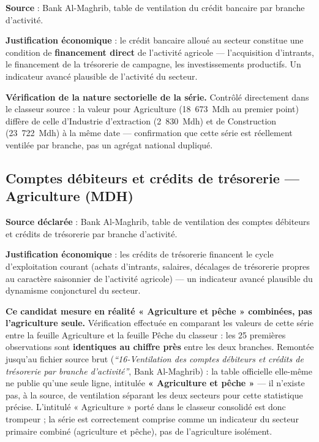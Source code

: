 \documentclass[11pt,a4paper]{article}
\begin{document}
\textbf{Source} : Bank Al-Maghrib, table de ventilation du crédit bancaire par branche d'activité.

\textbf{Justification économique} : le crédit bancaire alloué au secteur constitue une condition de \textbf{financement direct} de l'activité agricole --- l'acquisition d'intrants, le financement de la trésorerie de campagne, les investissements productifs. Un indicateur avancé plausible de l'activité du secteur.

\begin{sourcebox}
\textbf{Vérification de la nature sectorielle de la série.} Contrôlé directement dans le classeur source : la valeur pour Agriculture (18~673~Mdh au premier point) diffère de celle d'Industrie d'extraction (2~830~Mdh) et de Construction (23~722~Mdh) à la même date --- confirmation que cette série est réellement ventilée par branche, pas un agrégat national dupliqué.
\end{sourcebox}

\subsection{Comptes débiteurs et crédits de trésorerie --- Agriculture (MDH)}

\textbf{Source déclarée} : Bank Al-Maghrib, table de ventilation des comptes débiteurs et crédits de trésorerie par branche d'activité.

\textbf{Justification économique} : les crédits de trésorerie financent le cycle d'exploitation courant (achats d'intrants, salaires, décalages de trésorerie propres au caractère saisonnier de l'activité agricole) --- un indicateur avancé plausible du dynamisme conjoncturel du secteur.

\begin{alertebox}
\textbf{Ce candidat mesure en réalité « Agriculture et pêche » combinées, pas l'agriculture seule.} Vérification effectuée en comparant les valeurs de cette série entre la feuille Agriculture et la feuille Pêche du classeur : les 25 premières observations sont \textbf{identiques au chiffre près} entre les deux branches. Remontée jusqu'au fichier source brut (\textit{``16-Ventilation des comptes débiteurs et crédits de trésorerie par branche d'activité''}, Bank Al-Maghrib) : la table officielle elle-même ne publie qu'une seule ligne, intitulée \textbf{« Agriculture et pêche »} --- il n'existe pas, à la source, de ventilation séparant les deux secteurs pour cette statistique précise. L'intitulé « Agriculture » porté dans le classeur consolidé est donc trompeur ; la série est correctement comprise comme un indicateur du secteur primaire combiné (agriculture et pêche), pas de l'agriculture isolément.
\end{alertebox}
\end{document}
